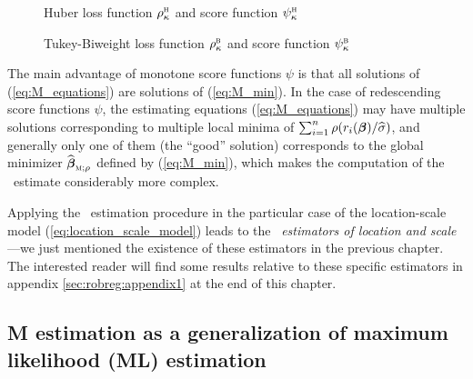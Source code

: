 \begin{figure}[h!]
    \centering
    \caption{Huber loss function $\rho_{\kappa}^{\stsc{H}}$ and score function $\psi_{\kappa}^{\stsc{H}}$}
    \label{fig:rho_psi_Huber}
\end{figure}

\begin{figure}[h!]
    \centering
    \caption{Tukey-Biweight loss function $\rho_{\kappa}^{\stsc{B}}$ and score function $\psi_{\kappa}^{\stsc{B}}$}
    \label{fig:rho_psi_Biweight}
\end{figure}

The main advantage of monotone score functions $\psi$ is that all solutions of
(\ref{eq:M_equations}) are solutions of (\ref{eq:M_min}). In the case of
redescending score functions $\psi$, the estimating equations
(\ref{eq:M_equations}) may have multiple solutions corresponding to multiple
local minima of $\sum_{i=1}^{n}\rho(r_i(\boldsymbol\beta)/\widehat{\sigma})$,
and generally only one of them (the “good” solution) corresponds to the global
minimizer $\sthat{\boldsymbol\beta}_{\stsc{M};\rho}$ defined by
(\ref{eq:M_min}), which makes the computation of the ~estimate
considerably more complex.

\begin{stremark}
Applying the ~estimation procedure in the particular case of the
location-scale model (\ref{eq:location_scale_model}) leads to the
~\emph{estimators of location and scale}---we just mentioned the
existence of these estimators in the previous chapter. The interested reader
will find some results relative to these specific estimators in appendix
\ref{sec:robreg:appendix1} at the end of this chapter.
\end{stremark}

\subsection{M estimation as a generalization of maximum likelihood (ML) estimation}

